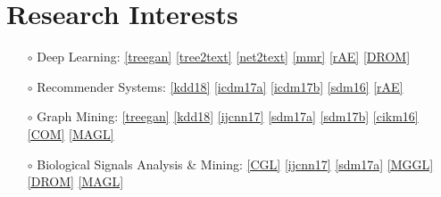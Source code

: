 \documentclass[a4paper,10pt]{article} %
\begin{document}
    
    \section{Research Interests}
    \begin{itemize}
    \item[$\circ$] Deep Learning:
    \ref{treegan}
    \ref{tree2text}
    \ref{net2text}
    \ref{mmr}
    \ref{rAE}
    \ref{DROM}
    \vspace{-0.25em}
    \item[$\circ$] Recommender Systems:
    \ref{kdd18}
    \ref{icdm17a}
    \ref{icdm17b}
    \ref{sdm16}
    \ref{rAE}
    \vspace{-0.25em}
    \item[$\circ$] Graph Mining: 
    \ref{treegan}
    \ref{kdd18}
    \ref{ijcnn17}
    \ref{sdm17a}
    \ref{sdm17b} 
    \ref{cikm16} 
    \ref{COM}
    \ref{MAGL} 
    \vspace{-0.25em}
    \item[$\circ$] Biological Signals Analysis \& Mining:
    \ref{CGL}
    \ref{ijcnn17}
    \ref{sdm17a}
    \ref{MGGL} 
    \ref{DROM}
    \ref{MAGL}
    \end{itemize}
    
\end{document}
